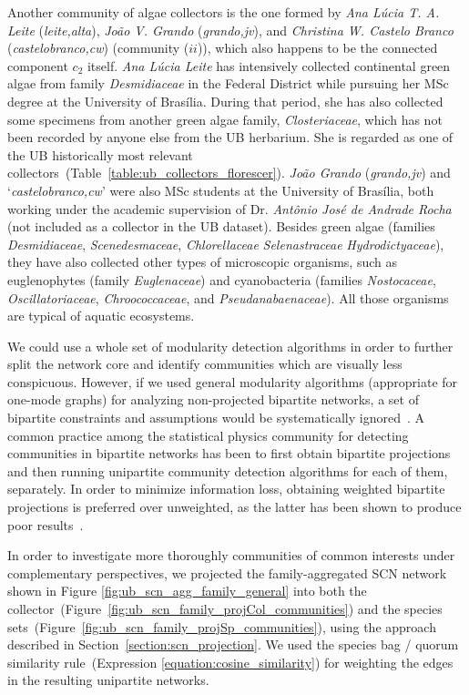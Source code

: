 Another community of algae collectors is the one formed by \textit{Ana Lúcia T. A. Leite} (\textit{leite,alta}), \textit{João V. Grando} (\textit{grando,jv}), and  \textit{Christina W. Castelo Branco} (\textit{castelobranco,cw}) (community ($ii$)), which also happens to be the connected component $c_2$ itself.
\textit{Ana Lúcia Leite} has intensively collected continental green algae from family \textit{Desmidiaceae} in the Federal District while pursuing her MSc degree at the University of Brasília.
During that period, she has also collected some specimens from another green algae family, \textit{Closteriaceae}, which has not been recorded by anyone else from the UB herbarium.
She is regarded as one of the UB historically most relevant collectors~(Table~\ref{table:ub_collectors_florescer}).
%
\textit{João Grando} (\textit{grando,jv}) and `\textit{castelobranco,cw}' were also MSc students at the University of Brasília, both working under the academic supervision of Dr. \textit{Antônio José de Andrade Rocha} (not included as a collector in the UB dataset).
Besides green algae (families \textit{Desmidiaceae}, \textit{Scenedesmaceae}, \textit{Chlorellaceae} \textit{Selenastraceae} \textit{Hydrodictyaceae}), they have also collected other types of microscopic organisms, such as euglenophytes (family \textit{Euglenaceae}) and cyanobacteria (families \textit{Nostocaceae}, \textit{Oscillatoriaceae}, \textit{Chroococcaceae}, and \textit{Pseudanabaenaceae}). 
All those organisms are typical of aquatic ecosystems.

We could use a whole set of modularity detection algorithms in order to further split the network core and identify communities which are visually less conspicuous. 
However, if we used general modularity algorithms (appropriate for one-mode graphs) for analyzing non-projected bipartite networks, a set of bipartite constraints and assumptions would be systematically ignored~\cite{Borgatti2015}.
A common practice among the statistical physics community for detecting communities in bipartite networks has been to first obtain bipartite projections and then running unipartite community detection algorithms for each of them, separately.
In order to minimize information loss, obtaining weighted bipartite projections is preferred over unweighted, as the latter has been shown to produce poor results~\cite{Guimera2007}.

In order to investigate more thoroughly communities of common interests under complementary perspectives, we projected the family-aggregated SCN network shown in Figure \ref{fig:ub_scn_agg_family_general} into both the collector~(Figure~\ref{fig:ub_scn_family_projCol_communities}) and the species sets~(Figure~\ref{fig:ub_scn_family_projSp_communities}), using the approach described in Section~\ref{section:scn_projection}.
We used the species bag / quorum similarity rule~(Expression \ref{equation:cosine_similarity}) for weighting the edges in the resulting unipartite networks.


